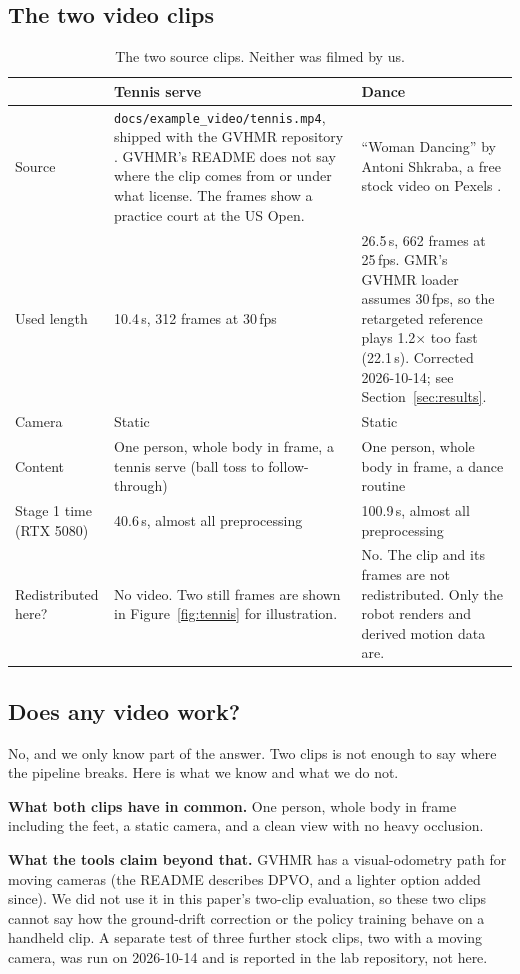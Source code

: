 \documentclass[11pt]{article}
\newcommand{\code}[1]{\texttt{#1}}
\begin{document}
\subsection{The two video clips}
\begin{table}[!htbp]
\centering\small
\caption{The two source clips. Neither was filmed by us.}
\label{tab:clips}
\begin{tabularx}{\linewidth}{@{}p{2.6cm}XX@{}}
\toprule
 & Tennis serve & Dance\\
\midrule
Source & \code{docs/example\_video/tennis.mp4}, shipped with the GVHMR repository \cite{gvhmr}. GVHMR's README does not say where the clip comes from or under what license. The frames show a practice court at the US Open. & ``Woman Dancing'' by Antoni Shkraba, a free stock video on Pexels \cite{pexels}.\\
Used length & 10.4\,s, 312 frames at 30\,fps & 26.5\,s, 662 frames at 25\,fps. GMR's GVHMR loader assumes 30\,fps, so the retargeted reference plays 1.2$\times$ too fast (22.1\,s). Corrected 2026-10-14; see Section~\ref{sec:results}.\\
Camera & Static & Static\\
Content & One person, whole body in frame, a tennis serve (ball toss to follow-through) & One person, whole body in frame, a dance routine\\
Stage 1 time (RTX 5080) & 40.6\,s, almost all preprocessing & 100.9\,s, almost all preprocessing\\
Redistributed here? & No video. Two still frames are shown in Figure~\ref{fig:tennis} for illustration. & No. The clip and its frames are not redistributed. Only the robot renders and derived motion data are.\\
\bottomrule
\end{tabularx}
\end{table}

\subsection{Does any video work?}
No, and we only know part of the answer. Two clips is not enough to say where the pipeline breaks. Here is what we know and what we do not.

\textbf{What both clips have in common.} One person, whole body in frame including the feet, a static camera, and a clean view with no heavy occlusion.

\textbf{What the tools claim beyond that.} GVHMR has a visual-odometry path for moving cameras (the README describes DPVO, and a lighter option added since). We did not use it in this paper's two-clip evaluation, so these two clips cannot say how the ground-drift correction or the policy training behave on a handheld clip. A separate test of three further stock clips, two with a moving camera, was run on 2026-10-14 and is reported in the lab repository, not here.
\end{document}
